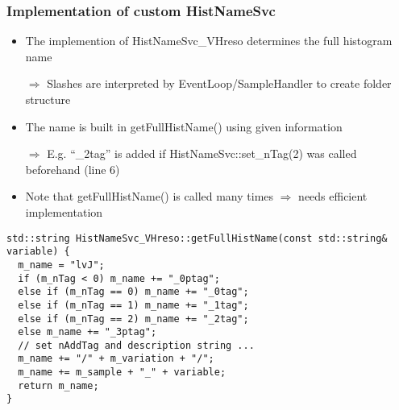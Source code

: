 \documentclass{beamer}
\begin{document}
\begin{frame}[fragile,t]
\frametitle{Implementation of custom HistNameSvc}
\begin{itemize}
 \item The implemention of HistNameSvc\_VHreso determines the full histogram name
 \item[$\Rightarrow$] Slashes are interpreted by EventLoop/SampleHandler to create folder structure
 \item The name is built in getFullHistName() using given information
 \item[$\Rightarrow$] E.g. ``\_2tag'' is added if HistNameSvc::set\_nTag(2) was called beforehand (line 6)
 \item Note that getFullHistName() is called many times $\Rightarrow$ needs efficient implementation
\end{itemize}
\begin{center}
\begin{minipage}{0.9\textwidth}
{\tiny
\begin{lstlisting}
std::string HistNameSvc_VHreso::getFullHistName(const std::string& variable) {
  m_name = "lvJ";
  if (m_nTag < 0) m_name += "_0ptag";
  else if (m_nTag == 0) m_name += "_0tag";
  else if (m_nTag == 1) m_name += "_1tag";
  else if (m_nTag == 2) m_name += "_2tag";
  else m_name += "_3ptag";
  // set nAddTag and description string ...
  m_name += "/" + m_variation + "/";
  m_name += m_sample + "_" + variable;
  return m_name;
}
\end{lstlisting}
}
\end{minipage}\\
\end{center}
\end{frame}
\end{document}
